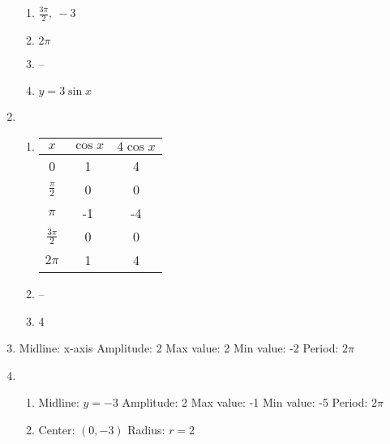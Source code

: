 \documentclass{article}
\begin{document}
\begin{enumerate}
\begin{enumerate}
	\item $\frac{3\pi}{2}, \ -3$
	
	\item $2\pi$
	
	\item --
	
	\item $y = 3\sin{x}$
	
	\end{enumerate}
	
\item 

	\begin{enumerate}
	
	\item
	\begin{tabular}{ c | c | c }
	$x$ & $\cos{x}$ & $4\cos{x}$ \\
	\hline
	0 & 1 & 4 \\
	$\frac{\pi}{2}$ & 0 & 0 \\
	$\pi$ & -1 & -4 \\
	$\frac{3\pi}{2}$ & 0 & 0 \\
	$2\pi$ & 1 & 4
	\end{tabular}
	
	\item --
	
	\item 4
	
	\end{enumerate}
	
\item Midline: x-axis \newline
	Amplitude: 2 \newline
	Max value: 2 \newline
	Min value: -2 \newline
	Period: $2\pi$

\item

	\begin{enumerate}
	
	\item Midline: $y = -3$ \newline
		Amplitude: 2 \newline
		Max value: -1 \newline
		Min value: -5 \newline
		Period: $2\pi$
		
	\item Center: $(0,-3)$ \newline
		Radius: $r = 2$
	

\end{enumerate}
\end{enumerate}
\end{document}
